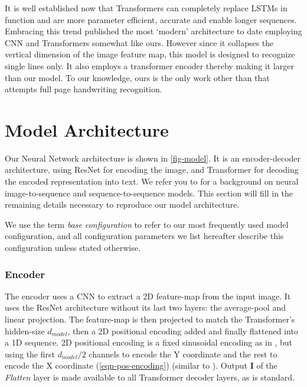 \documentclass[runningheads]{llncs}
\begin{document}
It is well established now that Transformers can completely replace {\small LSTMs} in function and are more parameter efficient, accurate and enable longer sequences.
Embracing this trend \citet{kang2020pay} published the most `modern' architecture to date employing {\small CNN} and Transformers somewhat like ours. However since it collapses the vertical dimension of the image feature map, this model is designed to recognize single lines only. It also employs a transformer encoder thereby making it larger than our model. To our knowledge, ours is the only work other than \citep{DBLP:journals/corr/BlucheLM16} that attempts full page handwriting recognition.

\section{Model Architecture}
Our Neural Network architecture is shown in \autoref{fig-model}.
It is an encoder-decoder architecture, using ResNet \citep{DBLP:journals/corr/HeZRS15} for encoding the image, and Transformer \citep{DBLP:journals/corr/VaswaniSPUJGKP17} for decoding the encoded representation into text.
We refer you to \citep{Xu2015ShowAA,DBLP:journals/corr/abs-1802-05415,DBLP:journals/corr/VaswaniSPUJGKP17,DBLP:journals/corr/SutskeverVL14} for a background on neural image-to-sequence and sequence-to-sequence models.
This section will fill in the remaining details necessary to reproduce our model architecture.

We use the term \emph{base configuration} to refer to our most frequently used model configuration, and all configuration parameters we list hereafter describe this configuration unless stated otherwise.

\subsubsection{Encoder}
 The encoder uses a {\small CNN} to extract a 2D feature-map from the input image.
 It uses the ResNet architecture without its last two layers: the average-pool and linear projection.
 The feature-map is then projected to match the Transformer's hidden-size $d_{model}$, then a 2D positional encoding added and finally flattened into a 1D sequence.
 2D positional encoding is a fixed sinusoidal encoding as in \citep{DBLP:journals/corr/VaswaniSPUJGKP17}, but using the first $d_{model}/2$ channels to encode the Y coordinate and the rest to encode the X coordinate (\autoref{eqn-pos-encoding}) (similar to \citep{parmar2018image}).
 Output $\boldsymbol{I}$ of the \emph{Flatten} layer is made available to all Transformer decoder layers, as is standard.
\end{document}

